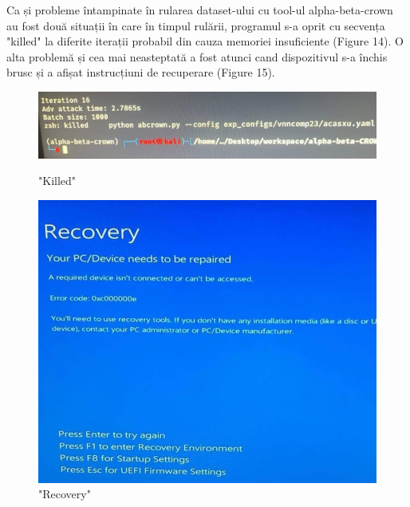 \documentclass[12pt,a4paper]{article}
\theoremstyle{definition}
\theoremstyle{remark}
\begin{document}
Ca și probleme întampinate în rularea dataset-ului cu tool-ul alpha-beta-crown au fost două situații în care în timpul rulării, programul s-a oprit cu secvența "killed" la diferite iterații probabil din cauza memoriei insuficiente (Figure 14). O alta problemă și cea mai neasteptată a fost atunci cand dispozitivul s-a închis brusc și a afișat instrucțiuni de recuperare (Figure 15).\par
\begin{figure}[!htb]
   \begin{minipage}{0.55\textwidth}
     \centering
     \includegraphics[width=.8\linewidth]{prob1.jpg}
     \caption{"Killed"}\label{Fig:Data1}
   \end{minipage}\hfill
   \begin{minipage}{0.48\textwidth}
     \centering
     \includegraphics[width=.8\linewidth]{prob2.jpg}
     \caption{"Recovery"}\label{Fig:Data2}
   \end{minipage}
\end{figure}
\end{document}
